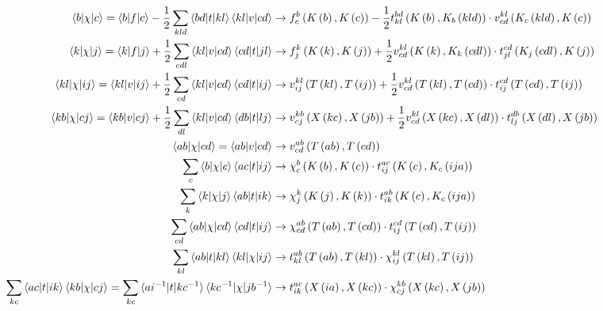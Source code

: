 \begin{align}
\braket{b| \chi |c} = \braket{b|f|c} - \frac{1}{2} \sum_{kld} \braket{bd|t|kl} \braket{kl|v|cd} &\rightarrow f_{c}^{b}\left( K\left( b\right),K\left( c\right)\right) - \frac{1}{2}t_{kl}^{bd}\left( K\left( b\right),K_{b}\left( kld\right)\right)\cdot v_{cd}^{kl}\left( K_{c}\left( kld\right),K\left( c\right)\right) \\
\braket{k| \chi |j} = \braket{k|f|j} + \frac{1}{2} \sum_{cdl} \braket{kl|v|cd} \braket{cd|t|jl} &\rightarrow f_{j}^{k}\left( K\left( k\right),K\left( j\right)\right) + \frac{1}{2}v_{cd}^{kl}\left( K\left( k\right),K_{k}\left( cdl\right)\right)\cdot t_{jl}^{cd}\left( K_{j}\left( cdl\right),K\left( j\right)\right) \\
\braket{kl| \chi |ij} = \braket{kl|v|ij} + \frac{1}{2} \sum_{cd} \braket{kl|v|cd} \braket{cd|t|ij} &\rightarrow v_{ij}^{kl}\left( T\left( kl\right),T\left( ij\right)\right) + \frac{1}{2}v_{cd}^{kl}\left( T\left( kl\right),T\left( cd\right)\right)\cdot t_{ij}^{cd}\left( T\left( cd\right),T\left( ij\right)\right) \\
\braket{kb| \chi |cj} = \braket{kb|v|cj} + \frac{1}{2} \sum_{dl} \braket{kl|v|cd} \braket{db|t|lj} &\rightarrow v_{cj}^{kb}\left( X\left( kc\right),X\left( jb\right)\right) + \frac{1}{2}v_{cd}^{kl}\left( X\left( kc\right),X\left( dl\right)\right)\cdot t_{lj}^{db}\left( X\left( dl\right),X\left( jb\right)\right) \\
\braket{ab| \chi |cd} = \braket{ab|v|cd} &\rightarrow v_{cd}^{ab}\left( T\left( ab\right),T\left( cd\right)\right) \\
\sum_{c} \braket{b| \chi |c} \braket{ac| t |ij} &\rightarrow \chi_{c}^{b}\left( K\left( b\right),K\left( c\right)\right)\cdot t_{ij}^{ac}\left( K\left( c\right), K_{c}\left( ija\right)\right) \\
\sum_{k} \braket{k| \chi |j} \braket{ab| t |ik} &\rightarrow \chi_{j}^{k}\left( K\left( j\right),K\left( k\right)\right)\cdot t_{ik}^{ab}\left( K\left( c\right), K_{c}\left( ija\right)\right) \\
\sum_{cd} \braket{ab| \chi |cd} \braket{cd| t |ij} &\rightarrow \chi_{cd}^{ab}\left( T\left( ab\right),T\left( cd\right)\right)\cdot t_{ij}^{cd}\left( T\left( cd\right),T\left( ij\right)\right) \\
\sum_{kl} \braket{ab| t |kl} \braket{kl| \chi |ij} &\rightarrow t_{kl}^{ab}\left( T\left( ab\right),T\left( kl\right)\right)\cdot \chi_{ij}^{kl}\left( T\left( kl\right),T\left( ij\right)\right) \\ 
\sum_{kc} \braket{ac| t |ik}\braket{kb| \chi |cj} = \sum_{kc} \braket{ai^{-1}| t |kc^{-1}}\braket{kc^{-1}| \chi |jb^{-1}} &\rightarrow t_{ik}^{ac}\left( X\left( ia\right),X\left( kc\right)\right)\cdot \chi_{cj}^{kb}\left( X\left( kc\right),X\left( jb\right)\right)
\end{align}


